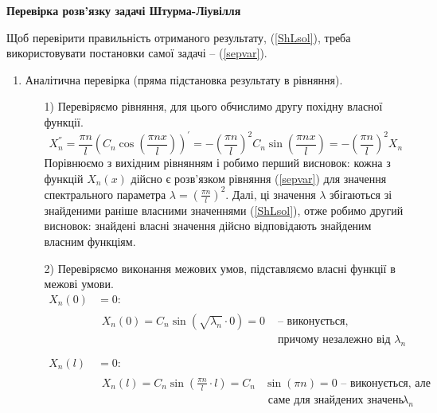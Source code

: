 \documentclass[a4paper, 14pt]{extreport}
\begin{document}
\begin{center}
    \large{\textbf{Перевірка розв'язку задачі Штурма-Ліувілля}}
\end{center}

\noindent Щоб перевірити правильність отриманого результату, (\ref{ShLsol}), треба використовувати постановки самої задачі -- (\ref{sepvar}). 
\begin{enumerate}
    \item Аналітична перевірка (пряма підстановка результату в рівняння).
    \begin{enumerate}
        \item[1)] Перевіряємо рівняння, для цього обчислимо другу похідну власної функції. 
        \begin{equation*}
            X_n^{''} = \frac{\pi n}{l} \left(C_n\cos\left(\frac{\pi n x}{l}\right)\right)^{'} = -\left(\frac{\pi n}{l}\right)^2 C_n\sin\left(\frac{\pi n x}{l}\right) = -\left(\frac{\pi n}{l}\right)^2 X_n
        \end{equation*}
        Порівнюємо з вихідним рівнянням і робимо перший висновок: кожна з функцій $X_n(x)$ дійсно є розв’язком рівняння (\ref{sepvar}) для значення спектрального параметра $\lambda = \left(\frac{\pi n}{l}\right)^2$. Далі, ці значення $\lambda$ збігаються зі знайденими раніше власними значеннями (\ref{ShLsol}), отже робимо другий висновок: знайдені власні значення дійсно відповідають знайденим власним функціям.
        \item[2)] Перевіряємо виконання межових умов, підставляємо власні функції в межові умови.
        \begin{equation*}
            \begin{aligned}
                X_n(0) &=  0:\\
                &\begin{aligned}
                    X_n(0) = C_n \sin(\sqrt{\lambda_n} \cdot 0) = 0 &\text{ -- виконується,}\\
                    &\text{ причому незалежно від }\lambda_n
                \end{aligned}\\
                \\
                X_n(l) &= 0:\\
                &\begin{aligned}
                    X_n(l) = C_n \sin\left(\frac{\pi n}{l} \cdot l\right) = C_n &\sin(\pi n) = 0 \text{ -- виконується,  але}\\
                    &\text{ саме для знайдених значень }\lambda_n

\end{aligned}
\end{aligned}
\end{equation*}
\end{enumerate}
\end{enumerate}
\end{document}
